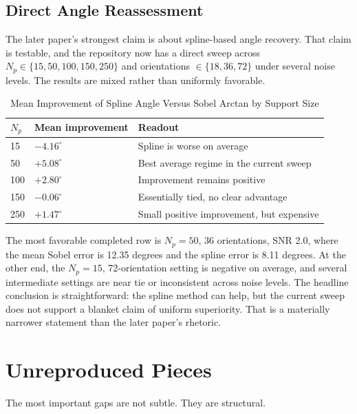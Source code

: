 \documentclass[conference]{IEEEtran}
\begin{document}
\subsection{Direct Angle Reassessment}

The later paper's strongest claim is about spline-based angle recovery. That claim is testable, and the repository now has a direct sweep across $N_p \in \{15,50,100,150,250\}$ and orientations $\in \{18,36,72\}$ under several noise levels. The results are mixed rather than uniformly favorable.

\begin{table}[t]
\centering
\caption{Mean Improvement of Spline Angle Versus Sobel Arctan by Support Size}
\label{tab:angle}
\scriptsize
\begin{tabular}{P{0.8cm}P{2.1cm}P{4.0cm}}
\toprule
$N_p$ & Mean improvement & Readout \\
  & $-4.16^\circ$ & Spline is worse on average \\
50  & $+5.08^\circ$ & Best average regime in the current sweep \\
100 & $+2.80^\circ$ & Improvement remains positive \\
150 & $-0.06^\circ$ & Essentially tied, no clear advantage \\
250 & $+1.47^\circ$ & Small positive improvement, but expensive \\
\bottomrule
\end{tabular}
\end{table}

The most favorable completed row is $N_p=50$, 36 orientations, SNR 2.0, where the mean Sobel error is 12.35 degrees and the spline error is 8.11 degrees. At the other end, the $N_p=15$, 72-orientation setting is negative on average, and several intermediate settings are near tie or inconsistent across noise levels. The headline conclusion is straightforward: the spline method can help, but the current sweep does not support a blanket claim of uniform superiority. That is a materially narrower statement than the later paper's rhetoric.

\section{Unreproduced Pieces}

The most important gaps are not subtle. They are structural.
\end{document}
